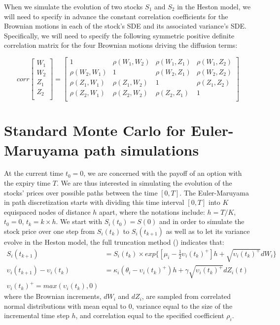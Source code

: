\documentclass{article}
\begin{document}
	When we simulate the evolution of two stocks $S_1$ and $S_2$ in the Heston model, we will need to specify in advance the constant correlation coefficients for the Brownian motions in each of the stock's SDE and its associated variance's SDE. Specifically, we will need to specify the following symmetric positive definite correlation matrix for the four Brownian motions driving the diffusion terms:
	
	\begin{equation}
	corr
	\begin{bmatrix} 
	W_1  \\
	W_2  \\
	Z_1  \\
	Z_2  \\
	\end{bmatrix}
	=
	\begin{bmatrix} 
	1 & \rho(W_1,W_2) & \rho(W_1,Z_1) & \rho(W_1,Z_2) \\
	\rho(W_2,W_1) & 1 & \rho(W_2,Z_1) & \rho(W_2,Z_2) \\
	\rho(Z_1,W_1) & \rho(Z_1,W_2) & 1 & \rho(Z_1,Z_2) \\
	\rho(Z_2,W_1) & \rho(Z_2,W_2) & \rho(Z_2,Z_1) & 1 \\
	\end{bmatrix}
	\end{equation}
	
\section{Standard Monte Carlo for Euler-Maruyama path simulations}
	At the current time $t_0=0$, we are concerned with the payoff of an option with the expiry time $T$. We are thus interested in simulating the evolution of the stocks' prices over possible paths between the time $[0,T]$. The Euler-Maruyama in path discretization starts with dividing this time interval $[0,T]$ into $K$ equispaced nodes of distance $h$ apart, where the notations include: $h = T/K$, $t_0=0$, $t_k=k \times h$. We start with $S_i(t_0)=S(0)$ and in order to simulate the stock price over one step from $S_i(t_k)$ to $S_i(t_{k+1})$ as well as to let its variance evolve in the Heston model, the full truncation method (\cite{andersen07}) indicates that:
	\begin{align}
	S_i(t_{k+1}) &= S_i(t_k) \times exp\{[\mu_i - \frac{1}{2} \upsilon_i(t_k)^+] h + \sqrt{\upsilon_i(t_k)^+} dW_i \} \\
		
	\upsilon_i(t_{k+1}) - \upsilon_i(t_k) &= \kappa_i (\theta_i - \upsilon_i(t_k)^+) h + \gamma \sqrt{\upsilon_i(t_k)^+} dZ_i(t) \\
	\upsilon_i(t_k)^+ = max(\upsilon_i(t_k),0)
	\end{align}
	where the Brownian increments, $dW_i$ and $dZ_i$, are sampled from correlated normal distributions with mean equal to 0, variance equal to the size of the incremental time step $h$, and correlation equal to the specified coefficient $\rho_i$. 
	
\end{document}
